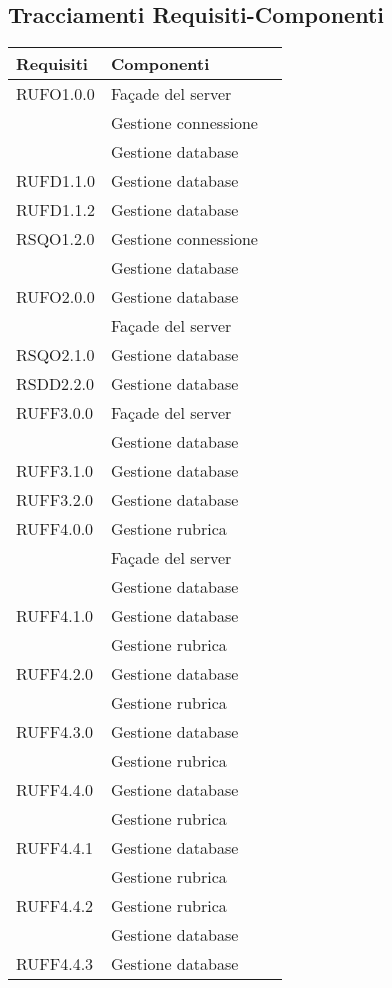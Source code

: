 \subsection{Tracciamenti Requisiti-Componenti}\label{sec:tracRecComp}

\begin{center}
\begin{longtable}{lp{}l}
\toprule Requisiti &  Componenti\\
\midrule
RUFO1.0.0 & Façade del server \\
 & Gestione connessione \\
 & Gestione database \\
RUFD1.1.0 & Gestione database \\
RUFD1.1.2 & Gestione database \\
RSQO1.2.0 & Gestione connessione \\
 & Gestione database \\
RUFO2.0.0 & Gestione database \\
 & Façade del server \\
RSQO2.1.0 & Gestione database \\
RSDD2.2.0 & Gestione database \\
RUFF3.0.0 & Façade del server \\
 & Gestione database \\
RUFF3.1.0 & Gestione database \\
RUFF3.2.0 & Gestione database \\
RUFF4.0.0 & Gestione rubrica \\
 & Façade del server \\
 & Gestione database \\
RUFF4.1.0 & Gestione database \\
 & Gestione rubrica \\
RUFF4.2.0 & Gestione database \\
 & Gestione rubrica \\
RUFF4.3.0 & Gestione database \\
 & Gestione rubrica \\
RUFF4.4.0 & Gestione database \\
 & Gestione rubrica \\
RUFF4.4.1 & Gestione database \\
 & Gestione rubrica \\
RUFF4.4.2 & Gestione rubrica \\
 & Gestione database \\
RUFF4.4.3 & Gestione database \\

\end{longtable}
\end{center}
